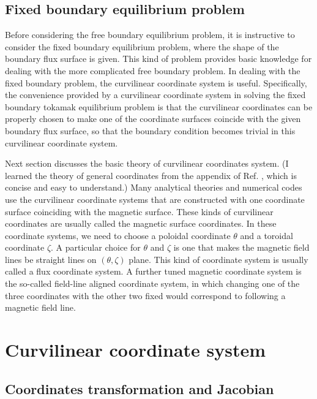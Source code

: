 \documentclass{article}
\begin{document}
\subsection{Fixed boundary equilibrium problem}

Before considering the free boundary equilibrium problem, it is instructive to
consider the fixed boundary equilibrium problem, where the shape of the
boundary flux surface is given. This kind of problem provides basic knowledge
for dealing with the more complicated free boundary problem. In dealing with
the fixed boundary problem, the curvilinear coordinate system is useful.
Specifically, the convenience provided by a curvilinear coordinate system in
solving the fixed boundary tokamak equilibrium problem is that the curvilinear
coordinates can be properly chosen to make one of the coordinate surfaces
coincide with the given boundary flux surface, so that the boundary condition
becomes trivial in this curvilinear coordinate system.

Next section discusses the basic theory of curvilinear coordinates system. (I
learned the theory of general coordinates from the appendix of Ref.
{\cite{boozer2005}}, which is concise and easy to understand.) Many analytical
theories and numerical codes use the curvilinear coordinate systems that are
constructed with one coordinate surface coinciding with the magnetic surface.
These kinds of curvilinear coordinates are usually called the magnetic surface
coordinates. In these coordinate systems, we need to choose a poloidal
coordinate $\theta$ and a toroidal coordinate $\zeta$. A particular choice for
$\theta$ and $\zeta$ is one that makes the magnetic field lines be straight
lines on $(\theta, \zeta)$ plane. This kind of coordinate system is usually
called a flux coordinate system. A further tuned magnetic coordinate system is
the so-called field-line aligned coordinate system, in which changing one of
the three coordinates with the other two fixed would correspond to following a
magnetic field line.

\section{Curvilinear coordinate system}

\subsection{Coordinates transformation and Jacobian}
\end{document}
